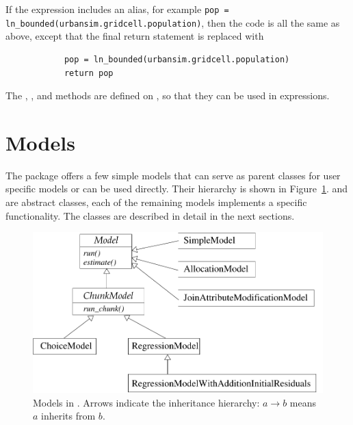 If the expression includes an alias, for example
\verb|pop = ln_bounded(urbansim.gridcell.population)|, then the code is all
the same as above, except that the final return statement is replaced with
\begin{verbatim}
            pop = ln_bounded(urbansim.gridcell.population)
            return pop
\end{verbatim}

The , , and 
methods are defined on , so that they can be used in
expressions.

\section{Models} 
\label{sec:opus-core-models}

The  package offers a few simple models that can serve as parent classes
for user specific models or can be used directly. Their hierarchy is shown in
Figure~\ref{fig:opus-core-model}.  and  are abstract
classes, each of the remaining models implements a specific 
functionality. The classes are described in detail in the next sections.

\begin{figure}
\begin{center}
\includegraphics[scale=0.8]{images/coremodelswithmethods.pdf}
\caption{\label{fig:opus-core-model}\small Models in . Arrows indicate the inheritance hierarchy:
$a \rightarrow b$ means $a$ inherits from $b$.}
\end{center}
\end{figure}


